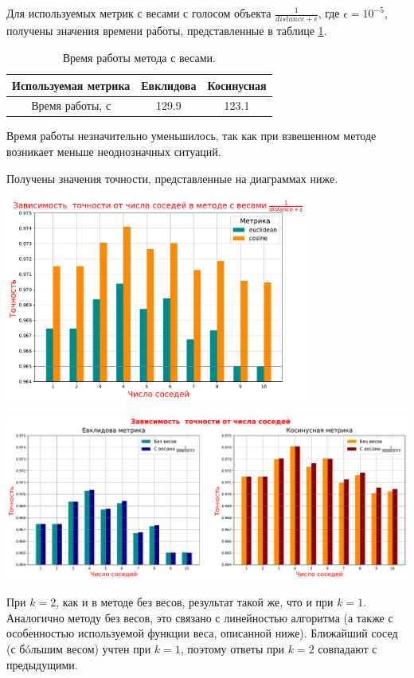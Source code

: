 \documentclass{article}
\begin{document}
Для используемых метрик с весами с голосом объекта $\frac{1}{distance + \epsilon}$, где $\epsilon={10}^{-5}$, получены значения времени работы, представленные в таблице \ref{tab:widgets3}.

\begin{table}[h]
\centering
\begin{tabular}{|c|c|c|}\hline
Используемая метрика & Евклидова & Косинусная \\\hline
Время работы, с & 129.9 & 123.1 \\\hline
\end{tabular}
\caption{\label{tab:widgets3} Время работы метода с весами.}
\end{table}

Время работы незначительно уменьшилось, так как при взвешенном методе возникает меньше неоднозначных ситуаций.

Получены значения точности, представленные на диаграммах ниже.
\begin{center}
\includegraphics[width=10cm]{TASK1 PRAC FIGURE 2.pdf}
\end{center}

\begin{center}
\includegraphics[width=15cm]{TASK1 PRAC FIGURE 2-1.pdf}
\end{center}

При $k=2$, как и в методе без весов, результат такой же, что и при $k=1$. Аналогично методу без весов, это связано с линейностью алгоритма (а также с особенностью используемой функции веса, описанной ниже). Ближайший сосед (с бóльшим весом) учтен при $k=1$, поэтому ответы при $k=2$ совпадают с предыдущими. 
\end{document}
